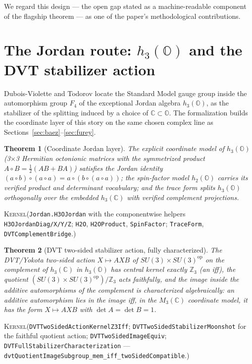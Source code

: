 \documentclass[11pt]{article}
\newcommand{\C}{\mathbb{C}}
\newcommand{\OO}{\mathbb{O}}
\newcommand{\Kernel}{\textcolor{kernelcolor}{\textsc{Kernel}}}
\newcommand{\leanname}[1]{\texttt{#1}}
\newtheorem{theorem}{Theorem}
\begin{document}
We regard this design --- the open gap stated as a machine-readable
component of the flagship theorem --- as one of the paper's
methodological contributions.

\section{The Jordan route: $h_3(\OO)$ and the DVT stabilizer action}
\label{sec:jordan}

Dubois-Violette and Todorov \cite{DVT2018} locate the Standard Model
gauge group inside the automorphism group $F_4$ of the exceptional
Jordan algebra $h_3(\OO)$, as the stabilizer of the splitting induced by
a choice of $\C \subset \OO$.  The formalization builds the coordinate
layer of this story on the same chosen complex line as
Sections~\ref{sec:baez}--\ref{sec:furey}.

\begin{theorem}[Coordinate Jordan layer]
The explicit coordinate model of $h_3(\OO)$ (3$\times$3 Hermitian
octonionic matrices with the symmetrized product
$A \circ B = \tfrac12(AB + BA)$) satisfies the Jordan identity
$(a\circ b)\circ(a\circ a) = a\circ(b\circ(a\circ a))$; the spin-factor
model $h_2(\OO)$ carries its verified product and determinant
vocabulary; and the trace form splits $h_3(\OO)$ orthogonally over the
embedded $h_3(\C)$ with verified complement projections.
\end{theorem}
\noindent\Kernel{}\quad(\leanname{Jordan.H3OJordan} with the
componentwise helpers \leanname{H3OJordanDiag/X/Y/Z};
\leanname{H2O}, \leanname{H2OProduct}, \leanname{SpinFactor};
\leanname{TraceForm}, \leanname{DVTComplementBridge}.)

\begin{theorem}[DVT two-sided stabilizer action, fully characterized]
\label{thm:dvt}
The DVT/Yokota two-sided action $X \mapsto AXB$ of
$SU(3)\times SU(3)^{\mathrm{op}}$ on the complement of $h_3(\C)$ in
$h_3(\OO)$ has central kernel exactly $\mathbb{Z}_3$ (an iff), the
quotient $(SU(3)\times SU(3)^{\mathrm{op}})/\mathbb{Z}_3$ acts
faithfully, and the image inside the additive automorphisms of the
complement is characterized algebraically: an additive automorphism lies
in the image \emph{iff}, in the $M_3(\C)$ coordinate model, it has the
form $X \mapsto AXB$ with $\det A = \det B = 1$.
\end{theorem}
\noindent\Kernel{}\quad(\leanname{DVTTwoSidedActionKernelZ3Iff};
\leanname{DVTTwoSidedStabilizerMoonshot} for the faithful quotient
action;
\leanname{DVTTwoSidedImageEquiv};
\leanname{DVTFullStabilizerCharacterization} ---
\leanname{dvtQuotientImageSubgroup\_mem\_iff\_twoSidedCompatible}.)
\end{document}
